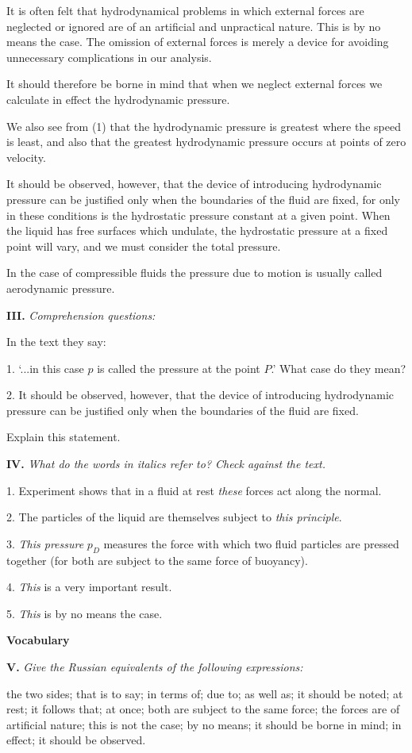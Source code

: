 \documentclass[a4paper]{article}
\newcommand{\ESect}[1]{\medskip\par{\large \textbf{#1}}\par}
\newcommand{\ETask}[2]{\medskip\par\textbf{#1.} \textit{#2}\par}
\begin{document}
It is often felt that hydrodynamical problems in which external forces are neglected or ignored are of an artificial and
unpractical nature. This is by no means the case. The omission of external forces is merely a device for avoiding unnecessary
complications in our analysis.

It should therefore be borne in mind that when we neglect external forces we calculate in effect the hydrodynamic pressure.

We also see from (1) that the hydrodynamic pressure is greatest where the speed is least, and also that the greatest
hydrodynamic pressure occurs at points of zero velocity.

It should be observed, however, that the device of introducing hydrodynamic pressure can be justified only when the boundaries
of the fluid are fixed, for only in these conditions is the hydrostatic pressure constant at a given point. When the liquid has
free surfaces which undulate, the hydrostatic pressure at a fixed point will vary, and we must consider the total pressure.

In the case of compressible fluids the pressure due to motion is usually called aerodynamic pressure.

\ETask{III}{Comprehension questions:}
In the text they say:

1. `...in this case $p$ is called the pressure at the point $P$.' What case do they mean?

2. It should be observed, however, that the device of introducing hydrodynamic pressure can be justified only when the
boundaries of the fluid are fixed.

Explain this statement.

\ETask{IV}{What do the words in italics refer to? Check against the text.}

1. Experiment shows that in a fluid at rest \textit{these} forces act along the normal.

2. The particles of the liquid are themselves subject to \textit{this principle}.

3. \textit{This pressure} $p_D$ measures the force with which two fluid particles are pressed together (for both are subject to the
same force of buoyancy).

4. \textit{This} is a very important result.

5. \textit{This} is by no means the case.

\ESect{Vocabulary}

\ETask{V}{Give the Russian equivalents of the following expressions:}
the two sides; that is to say; in terms of; due to; as well as; it should be noted; at rest; it follows that; at once; both are
subject to the same force; the forces are of artificial nature; this is not the case; by no means; it should be borne in mind;
in effect; it should be observed.
\end{document}

